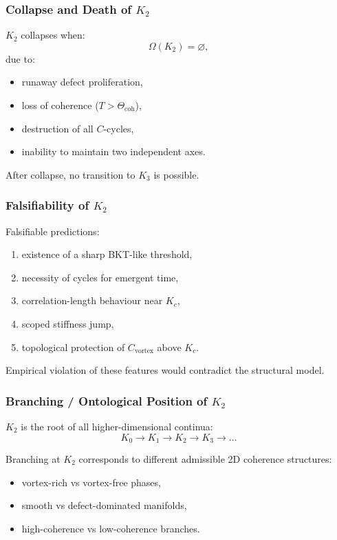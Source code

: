 \subsubsection{Collapse and Death of \texorpdfstring{$K_2$}{K_2}}

$K_2$ collapses when:
\[
\Omega(K_2) = \varnothing,
\]
due to:
\begin{itemize}
    \item runaway defect proliferation,
    \item loss of coherence ($T > \Theta_{\mathrm{coh}}$),
    \item destruction of all $C$-cycles,
    \item inability to maintain two independent axes.
\end{itemize}

After collapse, no transition to $K_3$ is possible.

\subsubsection{Falsifiability of \texorpdfstring{$K_2$}{K_2}}

Falsifiable predictions:
\begin{enumerate}
    \item existence of a sharp BKT-like threshold,
    \item necessity of cycles for emergent time,
    \item correlation-length behaviour near $K_c$,
    \item scoped stiffness jump,
    \item topological protection of $C_{\mathrm{vortex}}$ above $K_c$.
\end{enumerate}

Empirical violation of these features would contradict the structural
model.

\subsubsection{Branching / Ontological Position of \texorpdfstring{$K_2$}{K_2}}

$K_2$ is the root of all higher-dimensional continua:
\[
K_0 \to K_1 \to K_2 \to K_3 \to \dots
\]

Branching at $K_2$ corresponds to different admissible 2D coherence
structures:
\begin{itemize}
    \item vortex-rich vs vortex-free phases,
    \item smooth vs defect-dominated manifolds,
    \item high-coherence vs low-coherence branches.
\end{itemize}

